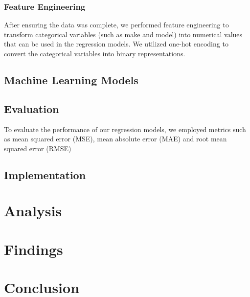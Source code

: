 \documentclass[a4paper, twocolumn]{article}
\begin{document}
\subsubsection{Feature Engineering}

After ensuring the data was complete, we performed feature engineering to transform categorical variables (such as make and model) into numerical values that can be used in the regression models. We utilized one-hot encoding to convert the categorical variables into binary representations.

\subsection{Machine Learning Models}

\subsection{Evaluation}
To evaluate the performance of our regression models, we employed metrics such as mean squared error (MSE), mean absolute error (MAE) and root mean squared error (RMSE)

\subsection{Implementation}


\section{Analysis\label{sec:Analysis}}


\section{Findings\label{sec:Findings}}


\section{Conclusion\label{sec:Conclusion}}

\end{document}

